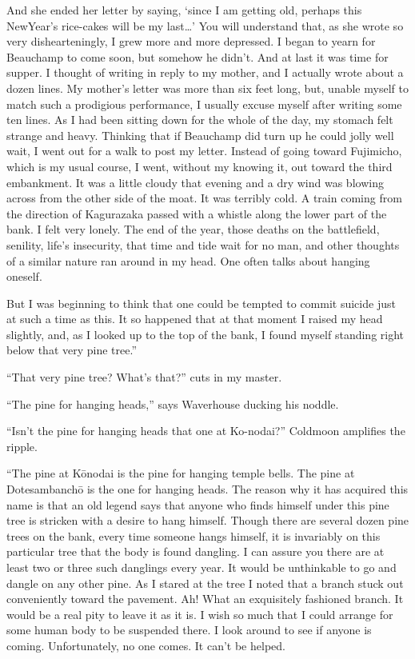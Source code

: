 \documentclass{book}
\begin{document}
And she ended her letter by saying, `since I am getting old, perhaps
this NewYear's rice-cakes will be my last\ldots{}' You will understand
that, as she wrote so very dishearteningly, I grew more and more
depressed. I began to yearn for Beauchamp to come soon, but somehow he
didn't. And at last it was time for supper. I thought of writing in
reply to my mother, and I actually wrote about a dozen lines. My
mother's letter was more than six feet long, but, unable myself to match
such a prodigious performance, I usually excuse myself after writing
some ten lines. As I had been sitting down for the whole of the day, my
stomach felt strange and heavy. Thinking that if Beauchamp did turn up
he could jolly well wait, I went out for a walk to post my letter.
Instead of going toward Fujimicho, which is my usual course, I went,
without my knowing it, out toward the third embankment. It was a little
cloudy that evening and a dry wind was blowing across from the other
side of the moat. It was terribly cold. A train coming from the
direction of Kagurazaka passed with a whistle along the lower part of
the bank. I felt very lonely. The end of the year, those deaths on the
battlefield, senility, life's insecurity, that time and tide wait for no
man, and other thoughts of a similar nature ran around in my head. One
often talks about hanging oneself.

But I was beginning to think that one could be tempted to commit suicide
just at such a time as this. It so happened that at that moment I raised
my head slightly, and, as I looked up to the top of the bank, I found
myself standing right below that very pine tree.''

``That very pine tree? What's that?'' cuts in my master.

``The pine for hanging heads,'' says Waverhouse ducking his noddle.

``Isn't the pine for hanging heads that one at Ko-nodai?'' Coldmoon
amplifies the ripple.

``The pine at Kōnodai is the pine for hanging temple bells. The pine at
Dotesambanchō is the one for hanging heads. The reason why it has
acquired this name is that an old legend says that anyone who finds
himself under this pine tree is stricken with a desire to hang himself.
Though there are several dozen pine trees on the bank, every time
someone hangs himself, it is invariably on this particular tree that the
body is found dangling. I can assure you there are at least two or three
such danglings every year. It would be unthinkable to go and dangle on
any other pine. As I stared at the tree I noted that a branch stuck out
conveniently toward the pavement. Ah! What an exquisitely fashioned
branch. It would be a real pity to leave it as it is. I wish so much
that I could arrange for some human body to be suspended there. I look
around to see if anyone is coming. Unfortunately, no one comes. It can't
be helped.
\end{document}
